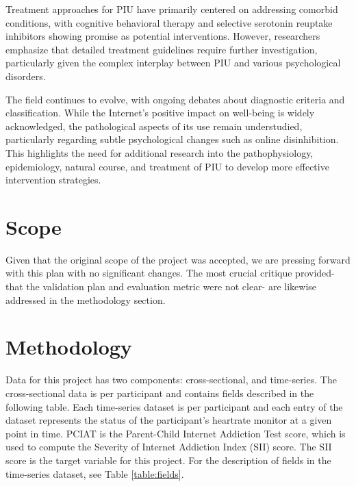 \documentclass[11pt]{extarticle}
\newcommand{\todo}{\textcolor{red}{TODO:}~}
\begin{document}
    Treatment approaches for PIU have primarily centered on addressing comorbid conditions, with cognitive behavioral therapy and selective serotonin reuptake inhibitors showing promise as potential interventions.
    However, researchers emphasize that detailed treatment guidelines require further investigation, particularly given the complex interplay between PIU and various psychological disorders.
    
    The field continues to evolve, with ongoing debates about diagnostic criteria and classification. While the Internet's positive impact on well-being is widely acknowledged, the pathological aspects of its use remain understudied, particularly regarding subtle psychological changes such as online disinhibition. 
    This highlights the need for additional research into the pathophysiology, epidemiology, natural course, and treatment of PIU to develop more effective intervention strategies.

\section{Scope}

    Given that the original scope of the project was accepted, we are pressing forward with this plan with no significant changes.
    The most crucial critique provided- that the validation plan and evaluation metric were not clear- are likewise addressed in the methodology section.

\section{Methodology} 

Data for this project has two components: cross-sectional, and time-series. The cross-sectional data is per participant and contains fields described in the following table.
Each time-series dataset is per participant and each entry of the dataset represents the status of the participant's heartrate monitor at a given point in time. PCIAT is the Parent-Child Internet Addiction Test score, which is used to compute the Severity of Internet Addiction Index (SII) score. The SII score is the target variable for this project. For the description of fields in the time-series dataset, see Table \ref{table:fields}.
\end{document}
